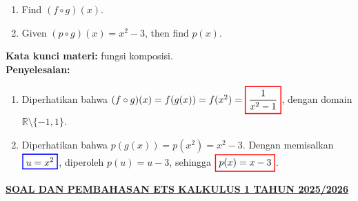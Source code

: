 \documentclass[10pt,openany,a4paper]{article}
\theoremstyle{definition}
\theoremstyle{definition}
\theoremstyle{plain}
\newenvironment{jawab}[2][tes]{%
\par\noindent\textbf{Kata kunci materi:} #1.\\
\textbf{Penyelesaian:} #2%
}{}
\begin{document}
\begin{enumerate}
            \begin{enumerate}
                \item Find $(f\circ g)(x)$.
                \item Given $(p\circ g)(x)=  x^2-3$, then find $p(x)$.
            \end{enumerate}
            \begin{jawab}[fungsi komposisi]{
                \begin{enumerate}
                    \item Diperhatikan bahwa $(f\circ g)(x) = f(g(x)) = f(x^2) = \colorlet{oldcolor}{.}
        \color{red}
        \setlength{\fboxrule}{1pt} \boxed{\color{oldcolor}\frac{1}{x^2-1}}\color{oldcolor}$, dengan domain $\mathbb{R}\setminus\{-1,1\}$.
                    \item Diperhatikan bahwa $p(g(x)) = p(x^2) = x^2-3$. Dengan memisalkan $\colorlet{oldcolor}{.}
        \color{blue}
        \setlength{\fboxrule}{1pt} \boxed{\color{oldcolor}u = x^2}\color{oldcolor}$, diperoleh $p(u)=u-3$, sehingga $\colorlet{oldcolor}{.}
        \color{red}
        \setlength{\fboxrule}{1pt} \boxed{\color{oldcolor}p(x) = x - 3}\color{oldcolor}$.
                \end{enumerate}
            }
            \end{jawab}
        \end{enumerate}
               \newpage
 \begin{center}
	{\underline{\textbf{\MakeUppercase{Soal dan Pembahasan ETS Kalkulus 1 Tahun 2025/2026}}}}
    \end{center}
\end{document}
